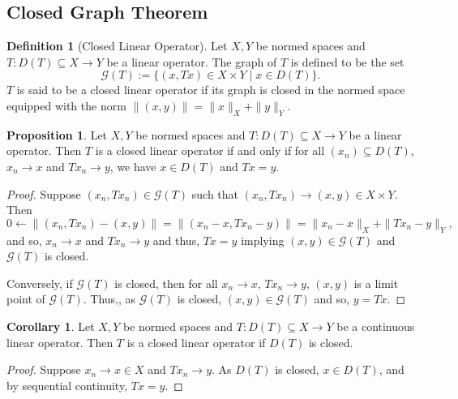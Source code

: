 \documentclass[]{article}
\theoremstyle{definition}
\theoremstyle{definition}
\newtheorem{definition}{Definition}[section]
\newtheorem{proposition}{Proposition}[section]
\newtheorem{corollary}{Corollary}[section]
\begin{document}
\subsection{Closed Graph Theorem}

\begin{definition}[Closed Linear Operator]
  Let \(X, Y\) be normed spaces and \(T : D(T) \subseteq X \to Y\) be a linear 
  operator. The graph of \(T\) is defined to be the set 
  \[\mathcal{G}(T) := \{(x, Tx) \in X \times Y \mid x \in D(T)\}.\]
  \(T\) is said to be a closed linear operator if its graph is closed 
  in the normed space equipped with the norm \(\|(x, y)\| = \|x\|_X + \|y\|_Y\).
\end{definition}

\begin{proposition}
  Let \(X, Y\) be normed spaces and \(T : D(T) \subseteq X \to Y\) be a 
  linear operator. Then \(T\) is a closed linear operator if and only if 
  for all \((x_n) \subseteq D(T)\), \(x_n \to x\) and \(T x_n \to y\), 
  we have \(x \in D(T)\) and \(Tx = y\).
\end{proposition}
\begin{proof}
  Suppose \((x_n, Tx_n) \in \mathcal{G}(T)\) such that \((x_n, Tx_n) \to 
  (x, y) \in X \times Y\). Then 
  \[0 \leftarrow \|(x_n, T x_n) - (x, y)\| = \|(x_n - x, T x_n - y)\| 
    = \|x_n - x\|_X + \|T x_n - y\|_Y,\]  
  and so, \(x_n \to x\) and \(T x_n \to y\) and thus, \(T x = y\) implying 
  \((x, y) \in \mathcal{G}(T)\) and \(\mathcal{G}(T)\) is closed.

  Conversely, if \(\mathcal{G}(T)\) is closed, then for all \(x_n \to x\), 
  \(T x_n \to y\), \((x, y)\) is a limit point of \(\mathcal{G}(T)\). Thus,,
  as \(\mathcal{G}(T)\) is closed, \((x, y) \in \mathcal{G}(T)\) and so, 
  \(y = Tx\).
\end{proof}

\begin{corollary}
  Let \(X, Y\) be normed spaces and \(T : D(T) \subseteq X \to Y\) be a 
  continuous linear operator. Then \(T\) is a closed linear operator if 
  \(D(T)\) is closed.
\end{corollary}
\begin{proof}
  Suppose \(x_n \to x \in X\) and \(T x_n \to y\). As \(D(T)\) is closed, 
  \(x \in D(T)\), and by sequential continuity, \(T x = y\).
\end{proof}
\end{document}
